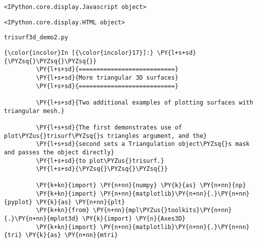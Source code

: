     
    \begin{verbatim}
<IPython.core.display.Javascript object>
    \end{verbatim}

    
    
    \begin{verbatim}
<IPython.core.display.HTML object>
    \end{verbatim}

    
    \texttt{trisurf3d\_demo2.py}

    \begin{Verbatim}[commandchars=\\\{\}]
{\color{incolor}In [{\color{incolor}17}]:} \PY{l+s+sd}{\PYZsq{}\PYZsq{}\PYZsq{}}
         \PY{l+s+sd}{===========================}
         \PY{l+s+sd}{More triangular 3D surfaces}
         \PY{l+s+sd}{===========================}
         
         \PY{l+s+sd}{Two additional examples of plotting surfaces with triangular mesh.}
         
         \PY{l+s+sd}{The first demonstrates use of plot\PYZus{}trisurf\PYZsq{}s triangles argument, and the}
         \PY{l+s+sd}{second sets a Triangulation object\PYZsq{}s mask and passes the object directly}
         \PY{l+s+sd}{to plot\PYZus{}trisurf.}
         \PY{l+s+sd}{\PYZsq{}\PYZsq{}\PYZsq{}}
         
         \PY{k+kn}{import} \PY{n+nn}{numpy} \PY{k}{as} \PY{n+nn}{np}
         \PY{k+kn}{import} \PY{n+nn}{matplotlib}\PY{n+nn}{.}\PY{n+nn}{pyplot} \PY{k}{as} \PY{n+nn}{plt}
         \PY{k+kn}{from} \PY{n+nn}{mpl\PYZus{}toolkits}\PY{n+nn}{.}\PY{n+nn}{mplot3d} \PY{k}{import} \PY{n}{Axes3D}
         \PY{k+kn}{import} \PY{n+nn}{matplotlib}\PY{n+nn}{.}\PY{n+nn}{tri} \PY{k}{as} \PY{n+nn}{mtri}
\end{Verbatim}


